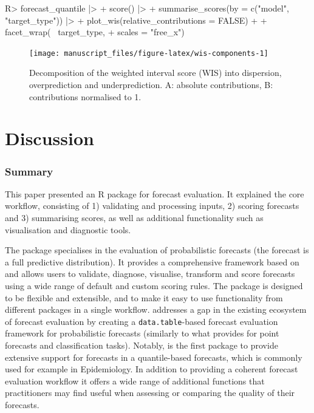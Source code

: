 \documentclass[
]{jss}
\begin{document}
\begin{CodeChunk}
\begin{CodeInput}
R> forecast_quantile |>
+   score() |>
+   summarise_scores(by = c("model", "target_type")) |>
+   plot_wis(relative_contributions = FALSE) + 
+   facet_wrap(~ target_type, 
+              scales = "free_x") 
\end{CodeInput}
\end{CodeChunk}

\begin{CodeChunk}
\begin{figure}[!h]

{\centering \texttt{[image: manuscript\_files/figure-latex/wis-components-1]} 

}

\caption[Decomposition of the weighted interval score (WIS) into dispersion, overprediction and underprediction]{Decomposition of the weighted interval score (WIS) into dispersion, overprediction and underprediction. A: absolute contributions, B: contributions normalised to 1.}\label{fig:wis-components}
\end{figure}
\end{CodeChunk}

\section{Discussion} \label{sec:discussion}

\subsubsection{Summary}\label{summary}

This paper presented  an R package for forecast
evaluation. It explained the core workflow, consisting of 1) validating
and processing inputs, 2) scoring forecasts and 3) summarising scores,
as well as additional functionality such as visualisation and diagnostic
tools.

The package specialises in the evaluation of probabilistic forecasts
(the forecast is a full predictive distribution). It provides a
comprehensive framework based on  and allows users to
validate, diagnose, visualise, transform and score forecasts using a
wide range of default and custom scoring rules. The package is designed
to be flexible and extensible, and to make it easy to use functionality
from different packages in a single workflow. 
addresses a gap in the existing ecosystem of forecast evaluation by
creating a \texttt{data.table}-based forecast evaluation framework for
probabilistic forecasts (similarly to what  provides for
point forecasts and classification tasks). Notably, 
is the first package to provide extensive support for forecasts in a
quantile-based forecasts, which is commonly used for example in
Epidemiology. In addition to providing a coherent forecast evaluation
workflow it offers a wide range of additional functions that
practitioners may find useful when assessing or comparing the quality of
their forecasts.
\end{document}
